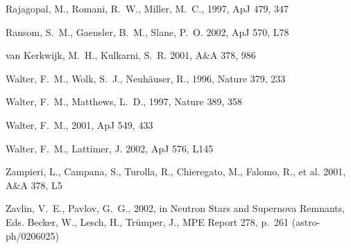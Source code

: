 \documentclass[twocolumn]{aa}
\begin{document}
\begin{thebibliography}{}
               Rajagopal, M., Romani, R.~W., Miller, M.~C., 
         1997, ApJ 479, 347

               Ransom, S.~M., Gaensler, B.~M., Slane, P.~O.
         2002, ApJ 570, L78

               van Kerkwijk, M.~H., Kulkarni, S.~R. 
         2001, A\&A 378, 986

               Walter, F.~M., Wolk, S.~J., Neuh\"auser, R., 
         1996, Nature 379, 233

               Walter, F.~M., Matthews, L.~D., 
         1997, Nature 389, 358

               Walter, F.~M., 
         2001, ApJ 549, 433

               Walter, F.~M., Lattimer, J. 
         2002, ApJ 576, L145

               Zampieri, L., Campana, S., Turolla, R., Chieregato, M.,
               Falomo, R., et al.  %
	 2001, A\&A 378, L5
	 
               Zavlin, V.~E., Pavlov, G.~G., 
         2002, in Neutron Stars and Supernova Remnants, 
               Eds. Becker, W., Lesch, H., Tr\"{u}mper, J., MPE Report 278, p.~261
               (astro-ph/0206025)
\end{thebibliography}
\end{document}
